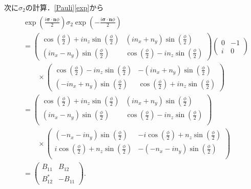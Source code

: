 \documentclass[a4paper]{ltjsreport}
\begin{document}
次に$\sigma_2$の計算．\eqref{Pauli}\eqref{exp}から
\begin{align}
  \begin{split}
    & \exp\left(\frac{i\boldsymbol{\sigma}\cdot\boldsymbol{n}\phi}{2}\right)\sigma_2\exp\left(-\frac{i\boldsymbol{\sigma}\cdot\boldsymbol{n}\phi}{2}\right)\\
    & =
    \begin{pmatrix}
      \cos\left(\frac{\phi}{2}\right)+in_z\sin\left(\frac{\phi}{2}\right) & (in_x+n_y)\sin\left(\frac{\phi}{2}\right) \\
      (in_x-n_y)\sin\left(\frac{\phi}{2}\right) & \cos\left(\frac{\phi}{2}\right)-in_z\sin\left(\frac{\phi}{2}\right)
    \end{pmatrix}
    \begin{pmatrix}
      0 & -1 \\
      i & 0
    \end{pmatrix}
    \\
    & \qquad\times
    \begin{pmatrix}
      \cos\left(\frac{\phi}{2}\right)-in_z\sin\left(\frac{\phi}{2}\right) & -(in_x+n_y)\sin\left(\frac{\phi}{2}\right) \\
      (-in_x+n_y)\sin\left(\frac{\phi}{2}\right) & \cos\left(\frac{\phi}{2}\right)+in_z\sin\left(\frac{\phi}{2}\right)
    \end{pmatrix}
    \\
    & =
    \begin{pmatrix}
      \cos\left(\frac{\phi}{2}\right)+in_z\sin\left(\frac{\phi}{2}\right) & (in_x+n_y)\sin\left(\frac{\phi}{2}\right) \\
      (in_x-n_y)\sin\left(\frac{\phi}{2}\right) & \cos\left(\frac{\phi}{2}\right)-in_z\sin\left(\frac{\phi}{2}\right) \\
    \end{pmatrix}
    \\
    & \qquad\times
    \begin{pmatrix}
      (-n_x-in_y)\sin\left(\frac{\phi}{2}\right) & -i\cos\left(\frac{\phi}{2}\right)+n_z\sin\left(\frac{\phi}{2}\right) \\
      i\cos\left(\frac{\phi}{2}\right)+n_z\sin\left(\frac{\phi}{2}\right) & -(-n_x-in_y)\sin\left(\frac{\phi}{2}\right) \\
    \end{pmatrix}
    \\
    & =
    \begin{pmatrix}
      B_{11} & B_{12}\\
      B_{12}^* & -B_{11}
    \end{pmatrix}
    .
  \end{split}
  \label{comp_2}
\end{align}
\end{document}
